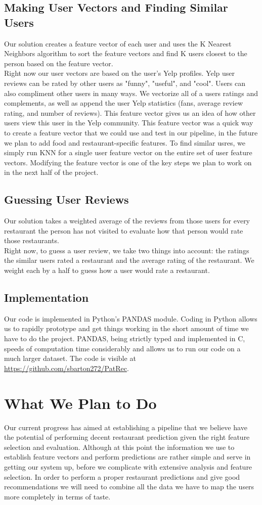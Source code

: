 \documentclass[10pt,twocolumn,letterpaper]{article}
\begin{document}
\subsection{Making User Vectors and Finding Similar Users}
Our solution creates a feature vector of each user and uses the K Nearest Neighbors algorithm to sort the feature vectors and find K users closest to the person based on the feature vector.
\\[0.5em]
\indent Right now our user vectors are based on the user's Yelp profiles. Yelp user reviews can be rated by other users as "funny", "useful", and "cool". Users can also compliment other users in many ways. We vectorize all of a users ratings and complements, as well as append the user Yelp statistics (fans, average review rating, and number of reviews). This feature vector gives us an idea of how other users view this user in the Yelp community. This feature vector was a quick way to create a feature vector that we could use and test in our pipeline, in the future we plan to add food and restaurant-specific features. To find similar usres, we simply run KNN for a single user feature vector on the entire set of user feature vectors. Modifying the feature vector is one of the key steps we plan to work on in the next half of the project.
\subsection{Guessing User Reviews}
Our solution takes a weighted average of the reviews from those users for every restaurant the person has not visited to evaluate how that person would rate those restaurants.
\\[0.5em]
\indent Right now, to guess a user review, we take two things into account: the ratings the similar users rated a restaurant and the average rating of the restaurant. We weight each by a half to guess how a user would rate a restaurant.
\subsection{Implementation}
Our code is implemented in Python's PANDAS module. Coding in Python allows us to rapidly prototype and get things working in the short amount of time we have to do the project. PANDAS, being strictly typed and implemented in C, speeds of computation time considerably and allows us to run our code on a much larger dataset. The code is visible at \url{https://github.com/sbarton272/PatRec}.

\section{What We Plan to Do}
Our current progress has aimed at establishing a pipeline that we believe have the potential of performing decent restaurant prediction given the right feature selection and evaluation. Although at this point the information we use to establish feature vectors and perform predictions are rather simple and serve in getting our system up, before we complicate with extensive analysis and feature selection. In order to perform a proper restaurant predictions and give good recommendations we will need to combine all the data we have to map the users more completely in terms of taste.
\end{document}
